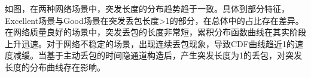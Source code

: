 
如图，在两种网络场景中，突发长度的分布趋势趋于一致。具体到部分特征，Excellent场景与Good场景在突发丢包长度>1的部分，在总体中的占比存在差异。在网络质量良好的场景中，突发丢包的长度非常短，累积分布函数曲线在其实阶段上升迅速。对于网络不稳定的场景，出现连续丢包现象，导致CDF曲线趋近1的速度减缓。当基于主动丢包的时间隐通道构造后，产生突发长度为1的丢包，对突发长度的分布曲线存在影响。